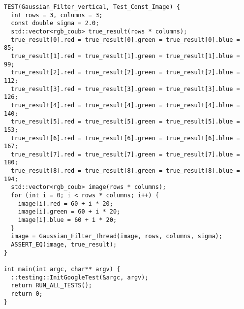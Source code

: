 \documentclass{report}
\begin{document}
\begin{lstlisting}
TEST(Gaussian_Filter_vertical, Test_Const_Image) {
  int rows = 3, columns = 3;
  const double sigma = 2.0;
  std::vector<rgb_coub> true_result(rows * columns);
  true_result[0].red = true_result[0].green = true_result[0].blue = 85;
  true_result[1].red = true_result[1].green = true_result[1].blue = 99;
  true_result[2].red = true_result[2].green = true_result[2].blue = 112;
  true_result[3].red = true_result[3].green = true_result[3].blue = 126;
  true_result[4].red = true_result[4].green = true_result[4].blue = 140;
  true_result[5].red = true_result[5].green = true_result[5].blue = 153;
  true_result[6].red = true_result[6].green = true_result[6].blue = 167;
  true_result[7].red = true_result[7].green = true_result[7].blue = 180;
  true_result[8].red = true_result[8].green = true_result[8].blue = 194;
  std::vector<rgb_coub> image(rows * columns);
  for (int i = 0; i < rows * columns; i++) {
    image[i].red = 60 + i * 20;
    image[i].green = 60 + i * 20;
    image[i].blue = 60 + i * 20;
  }
  image = Gaussian_Filter_Thread(image, rows, columns, sigma);
  ASSERT_EQ(image, true_result);
}

int main(int argc, char** argv) {
  ::testing::InitGoogleTest(&argc, argv);
  return RUN_ALL_TESTS();
  return 0;
}
\end{lstlisting}
\end{document}
